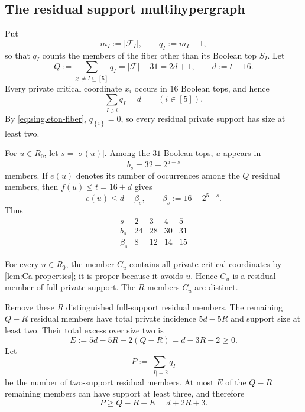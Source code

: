 \documentclass[11pt,reqno]{amsart}
\numberwithin{equation}{section}
\theoremstyle{definition}
\theoremstyle{remark}
\newcommand{\F}{\mathcal{F}}
\newcommand{\1}{\mathbf{1}}
\newcommand{\set}[1]{\left\{#1\right\}}
\newcommand{\abs}[1]{\left|#1\right|}
\begin{document}
\subsection{The residual support multihypergraph}

Put
\[
m_I:=\abs{\F_I},
\qquad q_I:=m_I-1,
\]
so that \(q_I\) counts the members of the fiber other than its Boolean top \(S_I\).  Let
\begin{equation}\label{eq:Q-d}
Q:=\sum_{\varnothing\ne I\subseteq[5]}q_I
=\abs\F-31
=2d+1,
\qquad d:=t-16.
\end{equation}
Every private critical coordinate \(x_i\) occurs in \(16\) Boolean tops, and hence
\begin{equation}\label{eq:residual-regular}
\sum_{I\ni i}q_I=d
\qquad(i\in[5]).
\end{equation}
By \cref{eq:singleton-fiber}, \(q_{\set{i}}=0\), so every residual private support has size at least two.

For \(u\in R_0\), let \(s=\abs{\sigma(u)}\).  Among the \(31\) Boolean tops, \(u\) appears in
\begin{equation}\label{eq:bs}
b_s=32-2^{5-s}
\end{equation}
members.  If \(e(u)\) denotes its number of occurrences among the \(Q\) residual members, then \(f(u)\le t=16+d\) gives
\begin{equation}\label{eq:e-upper}
e(u)\le d-\beta_s,
\qquad
\beta_s:=16-2^{5-s}.
\end{equation}
Thus
\[
\begin{array}{c|cccc}
 s&2&3&4&5\\ \hline
 b_s&24&28&30&31\\
 \beta_s&8&12&14&15
\end{array}
\]

For every \(u\in R_0\), the member \(C_u\) contains all private critical coordinates by \cref{lem:Ca-properties}; it is proper because it avoids \(u\).  Hence \(C_u\) is a residual member of full private support.  The \(R\) members \(C_u\) are distinct.

Remove these \(R\) distinguished full-support residual members.  The remaining \(Q-R\) residual members have total private incidence \(5d-5R\) and support size at least two.  Their total excess over size two is
\begin{equation}\label{eq:E}
E:=5d-5R-2(Q-R)=d-3R-2\ge0.
\end{equation}
Let
\begin{equation}\label{eq:P-pair}
P:=\sum_{\abs I=2}q_I
\end{equation}
be the number of two-support residual members.  At most \(E\) of the \(Q-R\) remaining members can have support at least three, and therefore
\begin{equation}\label{eq:P-lower}
P\ge Q-R-E=d+2R+3.
\end{equation}
\end{document}
